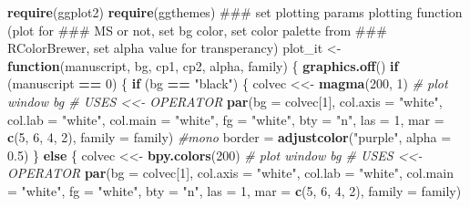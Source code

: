 \documentclass[10,portrait]{article}
\newenvironment{Shaded}{\begin{snugshade}}{\end{snugshade}}
\newcommand{\KeywordTok}[1]{\textcolor[rgb]{0.13,0.29,0.53}{\textbf{#1}}}
\newcommand{\DataTypeTok}[1]{\textcolor[rgb]{0.13,0.29,0.53}{#1}}
\newcommand{\DecValTok}[1]{\textcolor[rgb]{0.00,0.00,0.81}{#1}}
\newcommand{\FloatTok}[1]{\textcolor[rgb]{0.00,0.00,0.81}{#1}}
\newcommand{\StringTok}[1]{\textcolor[rgb]{0.31,0.60,0.02}{#1}}
\newcommand{\CommentTok}[1]{\textcolor[rgb]{0.56,0.35,0.01}{\textit{#1}}}
\newcommand{\ControlFlowTok}[1]{\textcolor[rgb]{0.13,0.29,0.53}{\textbf{#1}}}
\newcommand{\OperatorTok}[1]{\textcolor[rgb]{0.81,0.36,0.00}{\textbf{#1}}}
\newcommand{\NormalTok}[1]{#1}
\begin{document}
\begin{Shaded}
\begin{Highlighting}[]
\KeywordTok{require}\NormalTok{(ggplot2)}
\KeywordTok{require}\NormalTok{(ggthemes)}
\NormalTok{### set plotting params plotting function (plot for}
\NormalTok{### MS or not, set bg color, set color palette from}
\NormalTok{### RColorBrewer, set alpha value for transperancy)}
\NormalTok{plot_it <-}\StringTok{ }\ControlFlowTok{function}\NormalTok{(manuscript, bg, cp1, cp2, alpha, }
\NormalTok{    family) \{}
    \KeywordTok{graphics.off}\NormalTok{()}
    \ControlFlowTok{if}\NormalTok{ (manuscript }\OperatorTok{==}\StringTok{ }\DecValTok{0}\NormalTok{) \{}
        \ControlFlowTok{if}\NormalTok{ (bg }\OperatorTok{==}\StringTok{ "black"}\NormalTok{) \{}
\NormalTok{            colvec <<-}\StringTok{ }\KeywordTok{magma}\NormalTok{(}\DecValTok{200}\NormalTok{, }\DecValTok{1}\NormalTok{)  }\CommentTok{# plot window bg # USES <<- OPERATOR}
            \KeywordTok{par}\NormalTok{(}\DataTypeTok{bg =}\NormalTok{ colvec[}\DecValTok{1}\NormalTok{], }\DataTypeTok{col.axis =} \StringTok{"white"}\NormalTok{, }
                \DataTypeTok{col.lab =} \StringTok{"white"}\NormalTok{, }\DataTypeTok{col.main =} \StringTok{"white"}\NormalTok{, }
                \DataTypeTok{fg =} \StringTok{"white"}\NormalTok{, }\DataTypeTok{bty =} \StringTok{"n"}\NormalTok{, }\DataTypeTok{las =} \DecValTok{1}\NormalTok{, }\DataTypeTok{mar =} \KeywordTok{c}\NormalTok{(}\DecValTok{5}\NormalTok{, }
                  \DecValTok{6}\NormalTok{, }\DecValTok{4}\NormalTok{, }\DecValTok{2}\NormalTok{), }\DataTypeTok{family =}\NormalTok{ family)  }\CommentTok{#mono}
\NormalTok{            border =}\StringTok{ }\KeywordTok{adjustcolor}\NormalTok{(}\StringTok{"purple"}\NormalTok{, }\DataTypeTok{alpha =} \FloatTok{0.5}\NormalTok{)}
\NormalTok{        \} }\ControlFlowTok{else}\NormalTok{ \{}
\NormalTok{            colvec <<-}\StringTok{ }\KeywordTok{bpy.colors}\NormalTok{(}\DecValTok{200}\NormalTok{)  }\CommentTok{# plot window bg # USES <<- OPERATOR}
            \KeywordTok{par}\NormalTok{(}\DataTypeTok{bg =}\NormalTok{ colvec[}\DecValTok{1}\NormalTok{], }\DataTypeTok{col.axis =} \StringTok{"white"}\NormalTok{, }
                \DataTypeTok{col.lab =} \StringTok{"white"}\NormalTok{, }\DataTypeTok{col.main =} \StringTok{"white"}\NormalTok{, }
                \DataTypeTok{fg =} \StringTok{"white"}\NormalTok{, }\DataTypeTok{bty =} \StringTok{"n"}\NormalTok{, }\DataTypeTok{las =} \DecValTok{1}\NormalTok{, }\DataTypeTok{mar =} \KeywordTok{c}\NormalTok{(}\DecValTok{5}\NormalTok{, }
                  \DecValTok{6}\NormalTok{, }\DecValTok{4}\NormalTok{, }\DecValTok{2}\NormalTok{), }\DataTypeTok{family =}\NormalTok{ family)}

\end{Highlighting}
\end{Shaded}
\end{document}
